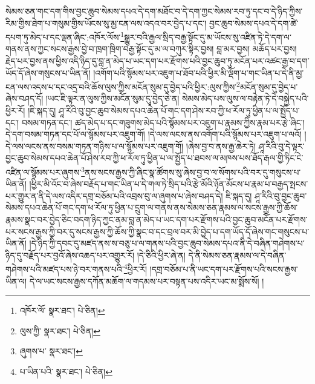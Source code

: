 སེམས་ཅན་གང་དག་གིས་བྱང་ཆུབ་སེམས་དཔའ་དེ་དག་མཐོང་བ་དེ་དག་ཀྱང་སེམས་རབ་ཏུ་དང་བ་དེ་ཉིད་ཀྱིས་རིམ་གྱིས་ཐེག་པ་གསུམ་གྱིས་ཡོངས་སུ་མྱ་ངན་ལས་འདའ་བར་བྱེད་པ་དང་། བྱང་ཆུབ་སེམས་དཔའ་དེ་དག་ཚེ་དཔག་ཏུ་མེད་པ་དང་ལྡན་ཞིང་:འཁོར་ལོས་\footnote{འཁོར་ལོ་  སྣར་ཐང་།  པེ་ཅིན། }སྒྱུར་བའི་རྒྱལ་སྲིད་བརྒྱ་སྟོང་དུ་མ་ཡོངས་སུ་འཛིན་ཏེ་དེ་དག་ལ་གནས་ནས་ཀྱང་སངས་རྒྱས་བྱེ་བ་ཁྲག་ཁྲིག་བརྒྱ་སྟོང་དུ་མ་ལ་བཀུར་སྟིར་བྱས། བླ་མར་བྱས། མཆོད་པར་བྱས། རྗེད་པར་བྱས་ནས་ཕྱིས་འདི་ཉིད་དུ་བླ་ན་མེད་པ་ཡང་དག་པར་རྫོགས་པའི་བྱང་ཆུབ་ཏུ་མངོན་པར་འཚང་རྒྱ་བ་དག་ཡོད་དོ་ཞེས་གསུངས་པ་ཡིན་ནོ། །འགོག་པའི་སྙོམས་པར་འཇུག་པ་ཐོབ་པའི་ཕྱིར་མི་ལྡོག་པ་གང་ཡིན་པ་དེ་ནི་མྱ་ངན་ལས་འདས་པ་དང་འདྲ་བའི་ཆོས་ལུས་ཀྱིས་མངོན་སུམ་དུ་བྱེད་པའི་ཕྱིར་:ལུས་ཀྱིས་\footnote{ལུས་ཀྱི་  སྣར་ཐང་།  པེ་ཅིན། }མངོན་སུམ་དུ་བྱེད་པ་ཞེས་བཤད་དོ། །ཡང་ཇི་ལྟར་ན་ལུས་ཀྱིས་མངོན་སུམ་དུ་བྱེད་ཅེ་ན། སེམས་མེད་པས་ལུས་ལ་བརྟེན་ཏེ་དེ་བསྐྱེད་པའི་ཕྱིར་རོ། །ཇི་སྐད་དུ། ཤཱ་རིའི་བུ་བྱང་ཆུབ་སེམས་དཔའ་ཆེན་པོ་གང་དག་ཤེས་རབ་ཀྱི་ཕ་རོལ་ཏུ་ཕྱིན་པ་ལ་སྤྱོད་པ་དང་། བསམ་གཏན་དང་། ཚད་མེད་པ་དང་གཟུགས་མེད་པའི་སྙོམས་པར་འཇུག་པ་རྣམས་ཀྱིས་རྣམ་པར་རྩེ་ཞིང་། དེ་དག་བསམ་གཏན་དང་པོ་ལ་སྙོམས་པར་འཇུག་གོ། །དེ་ལས་ལངས་ནས་འགོག་པའི་སྙོམས་པར་འཇུག་པ་ལའོ། །དེ་ལས་ལངས་ནས་བསམ་གཏན་གཉིས་པ་ལ་སྙོམས་པར་འཇུག་གོ། །ཞེས་བྱ་བ་ནས་རྒྱ་ཆེར་ཏེ། ཤཱ་རིའི་བུ་དེ་ལྟར་བྱང་ཆུབ་སེམས་དཔའ་ཆེན་པོ་ཤེས་རབ་ཀྱི་ཕ་རོལ་ཏུ་ཕྱིན་པ་ལ་སྤྱོད་པ་ཐབས་ལ་མཁས་པས་ཐོད་རྒལ་གྱི་ཏིང་ངེ་འཛིན་ལ་སྙོམས་པར་ཞུགས་\footnote{ཞུགས་པ་  སྣར་ཐང་། }ནས་སངས་རྒྱས་ཀྱི་ཞིང་སྣ་ཚོགས་སུ་ཞེས་བྱ་བ་ལ་སོགས་པའི་བར་དུ་གསུངས་པ་ཡིན་ནོ། །ཕྱིར་མི་འོང་བ་ཞེས་བརྗོད་པ་གང་ཡིན་པ་དེ་གལ་ཏེ་སྲིད་པའི་རྩེ་མོའི་ཉོན་མོངས་པ་རྣམ་པ་བརྒྱད་སྤངས་པར་གྱུར་ན་ནི་དེ་ལས་འདིར་དགྲ་བཅོམ་པའི་འབྲས་བུ་ལ་ཞུགས་པ་ཞེས་བཤད་དེ། ཇི་སྐད་དུ། ཤཱ་རིའི་བུ་བྱང་ཆུབ་སེམས་དཔའ་ཆེན་པོ་གང་དག་ཕ་རོལ་ཏུ་ཕྱིན་པ་དྲུག་ལ་གནས་ནས་སེམས་ཅན་རྣམས་ལ་སངས་རྒྱས་ཀྱི་ཆོས་རྣམས་སྣང་བར་བྱེད་ཅིང་བདག་ཉིད་ཀྱང་ནམ་བླ་ན་མེད་པ་ཡང་དག་པར་རྫོགས་པའི་བྱང་ཆུབ་མངོན་པར་རྫོགས་པར་སངས་རྒྱས་ཀྱི་བར་དུ་སངས་རྒྱས་ཀྱི་ཆོས་ཀྱི་སྣང་བ་དང་བྲལ་བར་མི་བྱེད་པ་དག་ཡོད་དོ་ཞེས་གང་གསུངས་པ་ཡིན་ནོ། །དེ་ཉིད་ཀྱི་དབང་དུ་མཛད་ནས་ས་བཅུ་པ་ལ་གནས་པའི་བྱང་ཆུབ་སེམས་དཔའ་ནི་དེ་བཞིན་གཤེགས་པ་ཉིད་དུ་བརྗོད་པར་བྱའོ་ཞེས་འཆད་པར་འགྱུར་རོ། །དེ་ཅིའི་ཕྱིར་ཞེ་ན། དེ་ནི་སེམས་ཅན་རྣམས་ལ་དེ་བཞིན་གཤེགས་པའི་མཛད་པས་ཉེ་བར་གནས་པའི་\footnote{པ་ཡིན་པའི་  སྣར་ཐང་།  པེ་ཅིན། }ཕྱིར་རོ། །དགྲ་བཅོམ་པ་ནི་ཡང་དག་པར་རྫོགས་པའི་སངས་རྒྱས་ཡིན་ལ། དེ་ལ་ཡང་སངས་རྒྱས་དཀོན་མཆོག་ལ་གདམས་པར་བསྟན་པས་འདིར་ཡང་མ་སྨོས་སོ། །
